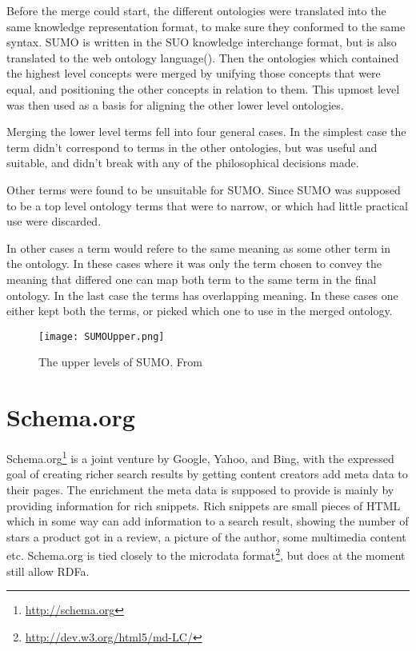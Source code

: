 Before the merge could start, the different ontologies were translated into the same knowledge representation format,
to make sure they conformed to the same syntax\citep{Niles2001}.
SUMO is written in the SUO knowledge interchange format, 
but is also translated to the web ontology language()\citep{Benzmuller2012}.
Then the ontologies which contained the highest level concepts were merged by unifying those concepts that were equal,
and positioning the other concepts in relation to them.
This upmost level was then used as a basis for aligning the other lower level ontologies\citep{Niles2001}.


Merging the lower level terms fell into four general cases.
In the simplest case the term didn't correspond to terms in the other ontologies, 
but was useful and suitable, and didn't break with any of the philosophical decisions made.

Other terms were found to be unsuitable for SUMO.
Since SUMO was supposed to be a top level ontology terms that were to narrow, 
or which had little practical use were discarded.

In other cases a term would refere to the same meaning as some other term in the ontology. 
In these cases where it was only the term chosen to convey the meaning that differed one can map both term to the same
term in the final ontology.
In the last case the terms has overlapping meaning. 
In these cases one either kept both the terms, or picked which one to use in the merged ontology.

\begin{figure}[h]
    \begin{center}
        \texttt{[image: SUMOUpper.png]}
        \caption{The upper levels of SUMO. From \protect \citet{Niles2001}}
        \label{SUMOUpper}
    \end{center}
\end{figure}
\section{Schema.org}
Schema.org\footnote{\url{http://schema.org}} is a joint venture by Google, Yahoo, and Bing, 
with the expressed goal of creating richer search results by getting content creators add meta data to their pages.
The enrichment the meta data is supposed to provide is mainly by providing information for rich snippets\citep{Guha2011}.
Rich snippets are small pieces of HTML which in some way can add information to a search result, 
showing the number of stars a product got in a review, a picture of the author, some multimedia content etc\citep{Mayer2009}.
Schema.org is tied closely to the microdata format\footnote{\url{http://dev.w3.org/html5/md-LC/}}, 
but does at the moment still allow RDFa.

